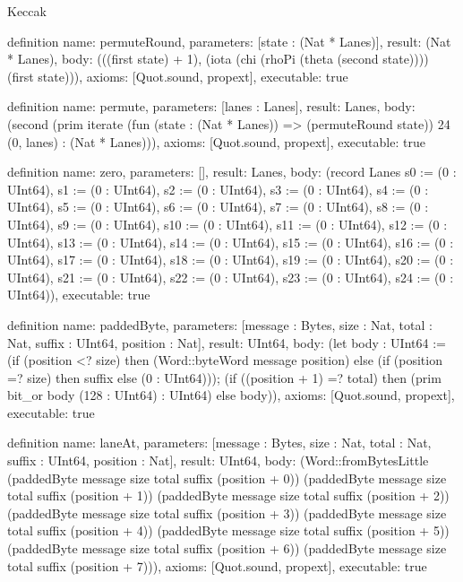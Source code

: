 \begin{lexlean}{Keccak}
\begin{semanticmodule}
definition{
  name: permuteRound,
  parameters: [state : (Nat * Lanes)],
  result: (Nat * Lanes),
  body: (((first state) + 1), (iota (chi (rhoPi (theta (second state)))) (first state))),
  axioms: [Quot.sound, propext],
  executable: true
}

definition{
  name: permute,
  parameters: [lanes : Lanes],
  result: Lanes,
  body: (second (prim iterate (fun (state : (Nat * Lanes)) => (permuteRound state)) 24 (0, lanes) : (Nat * Lanes))),
  axioms: [Quot.sound, propext],
  executable: true
}

definition{
  name: zero,
  parameters: [],
  result: Lanes,
  body: (record Lanes {s0 := (0 : UInt64), s1 := (0 : UInt64), s2 := (0 : UInt64), s3 := (0 : UInt64), s4 := (0 : UInt64), s5 := (0 : UInt64), s6 := (0 : UInt64), s7 := (0 : UInt64), s8 := (0 : UInt64), s9 := (0 : UInt64), s10 := (0 : UInt64), s11 := (0 : UInt64), s12 := (0 : UInt64), s13 := (0 : UInt64), s14 := (0 : UInt64), s15 := (0 : UInt64), s16 := (0 : UInt64), s17 := (0 : UInt64), s18 := (0 : UInt64), s19 := (0 : UInt64), s20 := (0 : UInt64), s21 := (0 : UInt64), s22 := (0 : UInt64), s23 := (0 : UInt64), s24 := (0 : UInt64)}),
  executable: true
}

definition{
  name: paddedByte,
  parameters: [message : Bytes, size : Nat, total : Nat, suffix : UInt64, position : Nat],
  result: UInt64,
  body: (let body : UInt64 := (if (position <? size) then (Word::byteWord message position) else (if (position =? size) then suffix else (0 : UInt64))); (if ((position + 1) =? total) then (prim bit_or body (128 : UInt64) : UInt64) else body)),
  axioms: [Quot.sound, propext],
  executable: true
}

definition{
  name: laneAt,
  parameters: [message : Bytes, size : Nat, total : Nat, suffix : UInt64, position : Nat],
  result: UInt64,
  body: (Word::fromBytesLittle (paddedByte message size total suffix (position + 0)) (paddedByte message size total suffix (position + 1)) (paddedByte message size total suffix (position + 2)) (paddedByte message size total suffix (position + 3)) (paddedByte message size total suffix (position + 4)) (paddedByte message size total suffix (position + 5)) (paddedByte message size total suffix (position + 6)) (paddedByte message size total suffix (position + 7))),
  axioms: [Quot.sound, propext],
  executable: true
}


\end{semanticmodule}
\end{lexlean}
